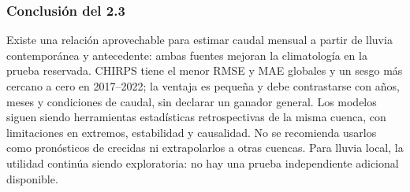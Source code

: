 \subsubsection*{Conclusión del 2.3}
Existe una relación aprovechable para estimar caudal mensual a partir de lluvia contemporánea y antecedente: ambas fuentes mejoran la climatología en la prueba reservada. CHIRPS tiene el menor RMSE y MAE globales y un sesgo más cercano a cero en 2017--2022; la ventaja es pequeña y debe contrastarse con años, meses y condiciones de caudal, sin declarar un ganador general. Los modelos siguen siendo herramientas estadísticas retrospectivas de la misma cuenca, con limitaciones en extremos, estabilidad y causalidad. No se recomienda usarlos como pronósticos de crecidas ni extrapolarlos a otras cuencas. Para lluvia local, la utilidad continúa siendo exploratoria: no hay una prueba independiente adicional disponible.
